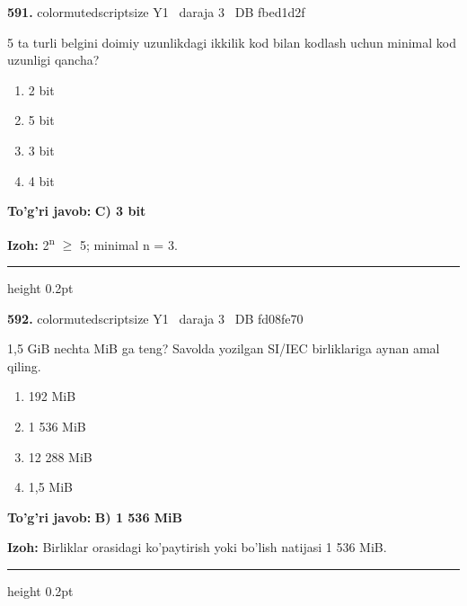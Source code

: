 \documentclass[10pt,a4paper,oneside]{article}
\begin{document}
\noindent\textbf{\color{ink}591.}  {color{muted}scriptsize Y1 \textbullet\ daraja 3 \textbullet\ DB fbed1d2f}
\par
5 ta turli belgini doimiy uzunlikdagi ikkilik kod bilan kodlash uchun minimal kod uzunligi qancha?
\begin{enumerate}[label=\Alph*),leftmargin=9mm]
\item 2 bit
\item 5 bit
\item 3 bit
\item 4 bit
\end{enumerate}
\begin{tcolorbox}[enhanced,breakable,colback=teal!4,colframe=teal!50!black,boxrule=0.5pt,arc=1.1mm,left=3mm,right=3mm,top=1.7mm,bottom=1.7mm,before skip=2mm,after skip=2mm]
\textbf{\color{teal}To'g'ri javob:} \textbf{C) 3 bit}
\par\smallskip
\textbf{Izoh:} 2\textsuperscript{n} \ensuremath{\geq} 5; minimal n = 3.
\end{tcolorbox}
\vspace{2mm}\hrule height 0.2pt \vspace{3mm}

\noindent\textbf{\color{ink}592.}  {color{muted}scriptsize Y1 \textbullet\ daraja 3 \textbullet\ DB fd08fe70}
\par
1,5 GiB nechta MiB ga teng? Savolda yozilgan SI/IEC birliklariga aynan amal qiling.
\begin{enumerate}[label=\Alph*),leftmargin=9mm]
\item 192 MiB
\item 1 536 MiB
\item 12 288 MiB
\item 1,5 MiB
\end{enumerate}
\begin{tcolorbox}[enhanced,breakable,colback=teal!4,colframe=teal!50!black,boxrule=0.5pt,arc=1.1mm,left=3mm,right=3mm,top=1.7mm,bottom=1.7mm,before skip=2mm,after skip=2mm]
\textbf{\color{teal}To'g'ri javob:} \textbf{B) 1 536 MiB}
\par\smallskip
\textbf{Izoh:} Birliklar orasidagi ko'paytirish yoki bo'lish natijasi 1 536 MiB.
\end{tcolorbox}
\vspace{2mm}\hrule height 0.2pt \vspace{3mm}
\end{document}
